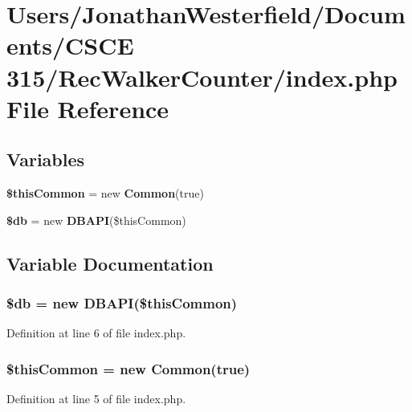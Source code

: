 \section{Users/\+Jonathan\+Westerfield/\+Documents/\+C\+S\+CE 315/\+Rec\+Walker\+Counter/index.php File Reference}
\label{index_8php}
\subsection*{Variables}
\begin{DoxyCompactItemize}
\item 
{\bf \$this\+Common} = new {\bf Common}(true)
\item 
{\bf \$db} = new {\bf D\+B\+A\+PI}(\$this\+Common)
\end{DoxyCompactItemize}


\subsection{Variable Documentation}
\subsubsection[{\$db}]{\setlength{\rightskip}{0pt plus 5cm}\$db = new {\bf D\+B\+A\+PI}(\$this\+Common)}\label{index_8php_a1fa3127fc82f96b1436d871ef02be319}


Definition at line 6 of file index.\+php.

\subsubsection[{\$this\+Common}]{\setlength{\rightskip}{0pt plus 5cm}\$this\+Common = new {\bf Common}(true)}\label{index_8php_a2dc37683cec5a169d791007363950944}


Definition at line 5 of file index.\+php.


